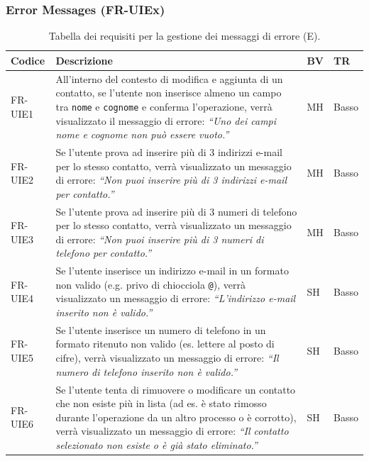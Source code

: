 \documentclass[a4paper,12pt]{article}
\begin{document}
    \subsubsection{Error Messages (FR-UIEx)}
    \begin{table}[H]
        \centering
        \begin{tabular}{|l|p{8cm}|l|l|}
            \hline
            \textbf{Codice} & \textbf{Descrizione} & \textbf{BV} & \textbf{TR} \\
            \hline
            FR-UIE1 &
            All'interno del contesto di modifica e aggiunta di un contatto,
            se l'utente non inserisce almeno un campo tra \texttt{nome} e \texttt{cognome}
            e conferma l'operazione, verrà visualizzato il messaggio di errore:
            \textit{“Uno dei campi nome e cognome non può essere vuoto.”} & MH & Basso \\
            \hline

            FR-UIE2 &
            Se l'utente prova ad inserire più di 3 indirizzi e-mail per lo stesso contatto,
            verrà visualizzato un messaggio di errore:
            \textit{“Non puoi inserire più di 3 indirizzi e-mail per contatto.”} & MH & Basso \\
            \hline

            FR-UIE3 &
            Se l'utente prova ad inserire più di 3 numeri di telefono per lo stesso contatto,
            verrà visualizzato un messaggio di errore:
            \textit{“Non puoi inserire più di 3 numeri di telefono per contatto.”} & MH & Basso \\
            \hline

            FR-UIE4 &
            Se l'utente inserisce un indirizzo e-mail in un formato non valido
            (e.g. privo di chiocciola \texttt{@}), verrà visualizzato un messaggio di errore:
            \textit{“L’indirizzo e-mail inserito non è valido.”} & SH & Basso \\
            \hline

            FR-UIE5 &
            Se l'utente inserisce un numero di telefono in un formato ritenuto non valido
            (es. lettere al posto di cifre), verrà visualizzato un messaggio di errore:
            \textit{“Il numero di telefono inserito non è valido.”} & SH & Basso \\
            \hline

            FR-UIE6 &
            Se l'utente tenta di rimuovere o modificare un contatto che non esiste più in lista
            (ad es. è stato rimosso durante l’operazione da un altro processo o è corrotto),
            verrà visualizzato un messaggio di errore:
            \textit{“Il contatto selezionato non esiste o è già stato eliminato.”} & SH & Basso \\
            \hline
        \end{tabular}
        \caption{Tabella dei requisiti per la gestione dei messaggi di errore (E).}
    \end{table}
\end{document}
